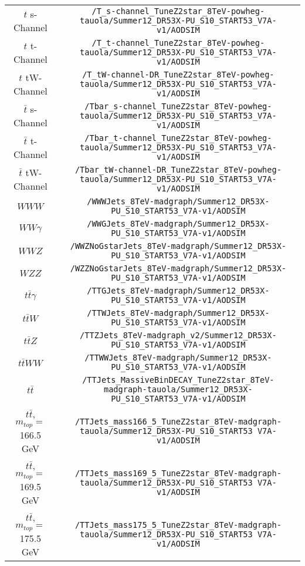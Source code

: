 \begin{sidewaystable}[b]
\begin{tabular}{c|c}
\hline 
$t$ s-Channel & \verb+/T_s-channel_TuneZ2star_8TeV-powheg-tauola/Summer12_DR53X-PU_S10_START53_V7A-v1/AODSIM+ \\
$t$ t-Channel & \verb+/T_t-channel_TuneZ2star_8TeV-powheg-tauola/Summer12_DR53X-PU_S10_START53_V7A-v1/AODSIM+ \\
$t$ tW-Channel & \verb+/T_tW-channel-DR_TuneZ2star_8TeV-powheg-tauola/Summer12_DR53X-PU_S10_START53_V7A-v1/AODSIM+ \\
$\bar{t}$ s-Channel & \verb+/Tbar_s-channel_TuneZ2star_8TeV-powheg-tauola/Summer12_DR53X-PU_S10_START53_V7A-v1/AODSIM+ \\
$\bar{t}$ t-Channel & \verb+/Tbar_t-channel_TuneZ2star_8TeV-powheg-tauola/Summer12_DR53X-PU_S10_START53_V7A-v1/AODSIM+ \\
$\bar{t}$ tW-Channel & \verb+/Tbar_tW-channel-DR_TuneZ2star_8TeV-powheg-tauola/Summer12_DR53X-PU_S10_START53_V7A-v1/AODSIM+ \\
\hline 
$WWW$ & \verb+/WWWJets_8TeV-madgraph/Summer12_DR53X-PU_S10_START53_V7A-v1/AODSIM+ \\
$WW\gamma$ & \verb+/WWGJets_8TeV-madgraph/Summer12_DR53X-PU_S10_START53_V7A-v1/AODSIM+ \\
$WWZ$ & \verb+/WWZNoGstarJets_8TeV-madgraph/Summer12_DR53X-PU_S10_START53_V7A-v1/AODSIM+ \\
$WZZ$ & \verb+/WZZNoGstarJets_8TeV-madgraph/Summer12_DR53X-PU_S10_START53_V7A-v1/AODSIM+ \\
$t\bar{t}\gamma$ & \verb+/TTGJets_8TeV-madgraph/Summer12_DR53X-PU_S10_START53_V7A-v1/AODSIM+ \\
$t\bar{t}W$ & \verb+/TTWJets_8TeV-madgraph/Summer12_DR53X-PU_S10_START53_V7A-v1/AODSIM+ \\
$t\bar{t}Z$ & \verb+/TTZJets_8TeV-madgraph_v2/Summer12_DR53X-PU_S10_START53_V7A-v1/AODSIM+ \\
$t\bar{t}WW$ & \verb+/TTWWJets_8TeV-madgraph/Summer12_DR53X-PU_S10_START53_V7A-v1/AODSIM+ \\
\hline 
$t\bar{t}$ & \verb+/TTJets_MassiveBinDECAY_TuneZ2star_8TeV-madgraph-tauola/Summer12_DR53X-PU_S10_START53_V7A-v1/AODSIM+ \\
$t\bar{t}$, $m_{top} =$ 166.5 GeV & \verb+/TTJets_mass166_5_TuneZ2star_8TeV-madgraph-tauola/Summer12_DR53X-PU_S10_START53 V7A-v1/AODSIM+ \\
$t\bar{t}$, $m_{top} =$ 169.5 GeV & \verb+/TTJets_mass169_5_TuneZ2star_8TeV-madgraph-tauola/Summer12_DR53X-PU_S10_START53 V7A-v1/AODSIM+ \\
$t\bar{t}$, $m_{top} =$ 175.5 GeV & \verb+/TTJets_mass175_5_TuneZ2star_8TeV-madgraph-tauola/Summer12_DR53X-PU_S10_START53 V7A-v1/AODSIM+ \\

\end{tabular}
\end{sidewaystable}

